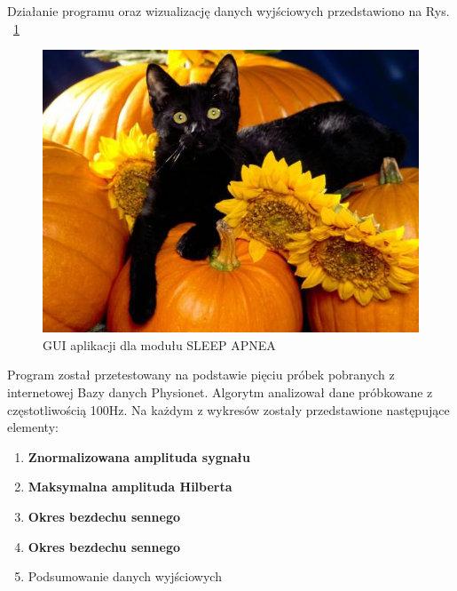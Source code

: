 Działanie programu oraz wizualizację danych wyjściowych przedstawiono na Rys. ~\ref{fig:gui1}
\begin{figure}[H]
\centering
\includegraphics[scale=0.6]{SLEEP_APNEA/img/cat.png}
\caption{GUI aplikacji dla modułu SLEEP APNEA}
\label{fig:gui1}
\end{figure} 
Program został przetestowany na podstawie pięciu próbek pobranych z internetowej Bazy danych Physionet. Algorytm analizował dane próbkowane z częstotliwością 100Hz.
Na każdym z wykresów zostały przedstawione następujące elementy:
\begin{enumerate}
 \item \textbf {\color{blue}Znormalizowana amplituda sygnału}
 \item \textbf {\color{black}Maksymalna amplituda Hilberta}
 \item \textbf {\color{red}Okres bezdechu sennego}
 \item \textbf {\color{green}Okres bezdechu sennego}
 \item {Podsumowanie danych wyjściowych}
\end{enumerate}

